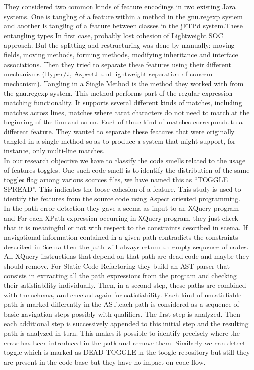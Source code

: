 \documentclass[conference]{IEEEtran}
\begin{document}
They considered two common kinds of feature encodings in two existing Java systems. One is tangling of a feature within a method in the gnu.regexp system and another is tangling of a feature between classes in the jFTPd system.These entangling types In first case, probably lost cohesion of Lightweight SOC approach. But the splitting and restructuring was done by manually: moving fields, moving methods, forming methods, modifying inheritance and interface associations. Then they tried to separate these features using their different mechanisms (Hyper/J, AspectJ and lightweight separation of concern mechanism). Tangling in a Single Method is the method they worked with from the gnu.regexp system. This method performs part of the regular expression matching functionality. It supports several different kinds of matches, including matches across lines, matches where carat characters do not need to match at the beginning of the line and so on. Each of these kind of matches corresponds to a different feature. They wanted to separate these features that were originally tangled in a single method so as to produce a system that might support, for instance, only multi-line matches.\\

In our research objective we have to classify the code smells related to the usage of features toggles. One such code smell is to identify the distribution of the same toggles flag among various sources files, we have named this as ``TOGGLE SPREAD''. This indicates the loose cohesion of a feature. This study is used to identify the features from the source code using Aspect oriented programming.\\ 

In the path-error detection they gave a scema as input to an XQuery program and For each XPath expression occurring in XQuery program, they just check that it is meaningful or not with respect to the constraints described in scema. If navigational information contained in a given path contradicts the constraints described in Scema then the path will always return an empty sequence of nodes.\\

All XQuery instructions that depend on that path are dead code and maybe they should remove. For Static Code Refactoring they build an AST parser that consists in extracting all the path expressions from the program and checking their satisfiability individually. Then, in a second step, these paths are combined with the schema, and checked again for satisfiability. Each kind of unsatisfiable path is marked differently in the AST.each path is considered as a sequence of basic navigation steps possibly with qualifiers. The first step is analyzed. Then each additional step is successively appended to this initial step and the resulting path is analyzed in turn. This makes it possible to identify precisely where the error has been introduced in the path and remove them. Similarly we can detect toggle which is marked as DEAD TOGGLE in the toogle repository but still they are present in the code base but they have no impact on code flow.\\
\end{document}

